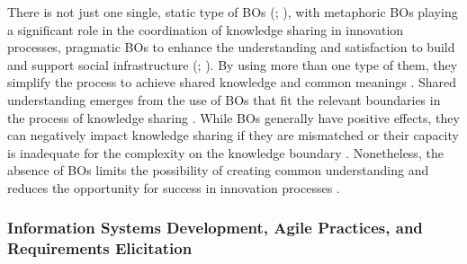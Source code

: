 \documentclass[12pt,oneside]{article}
\begin{document}
There is not just one single, static type of \ac{BO}s (\citealp[17]{koskinen2005metaphoric}; \citealp[1086]{marheineke2016bridging}), with metaphoric \ac{BO}s playing a significant role in the coordination of knowledge sharing in innovation processes, pragmatic \ac{BO}s to enhance the understanding and satisfaction to build and support social infrastructure (\citealp[17]{koskinen2005metaphoric}; \citealp[16-17, 21]{marheineke2016importance}). By using more than one type of them, they simplify the process to achieve shared knowledge and common meanings \citep[1090]{marheineke2016bridging}. Shared understanding emerges from the use of \ac{BO}s that fit the relevant boundaries in the process of knowledge sharing \citep[18]{marheineke2016importance}. While \ac{BO}s generally have positive effects, they can negatively impact knowledge sharing if they are mismatched or their capacity is inadequate for the complexity on the knowledge boundary \citep[323]{rosenkranz2014boundary}. Nonetheless, the absence of \ac{BO}s limits the possibility of creating common understanding and reduces the opportunity for success in innovation processes \citep[9]{koskinen2005metaphoric}.

\subsubsection{Information Systems Development, Agile Practices, and Requirements Elicitation} \label{is-development}
\end{document}
